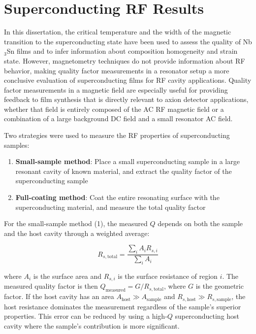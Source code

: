 
\chapter{Superconducting RF Results}\label{sec:CavityRF}

In this dissertation, the critical temperature and the width of the magnetic transition to the superconducting state have been used to assess the quality of Nb$_3$Sn films and to infer information about composition homogeneity and strain state. However, magnetometry techniques do not provide information about RF behavior, making quality factor measurements in a resonator setup a more conclusive evaluation of superconducting films for RF cavity applications. Quality factor measurements in a magnetic field are especially useful for providing feedback to film synthesis that is directly relevant to axion detector applications, whether that field is entirely composed of the AC RF magnetic field or a combination of a large background DC field and a small resonator AC field.


Two strategies were used to measure the RF properties of superconducting samples:
\begin{enumerate}
    \item \textbf{Small-sample method}: Place a small superconducting sample in a large resonant cavity of known material, and extract the quality factor of the superconducting sample
    \item \textbf{Full-coating method}: Coat the entire resonating surface with the superconducting material, and measure the total quality factor
\end{enumerate}

\noindent For the small-sample method (1), the measured $Q$ depends on both the sample and the host cavity through a weighted average:

\begin{equation}
    R_{s,\text{total}} = \frac{\sum_i A_i R_{s,i}}{\sum_i A_i}
\end{equation}

\noindent where $A_i$ is the surface area and $R_{s,i}$ is the surface resistance of region $i$. The measured quality factor is then $Q_\text{measured} = G/R_{s,\text{total}}$, where $G$ is the geometric factor. If the host cavity has an area $A_\text{host} \gg A_\text{sample}$ and $R_{s,\text{host}} \gg R_{s,\text{sample}}$, the host resistance dominates the measurement regardless of the sample's superior properties. This error can be reduced by using a high-$Q$ superconducting host cavity where the sample's contribution is more significant.

